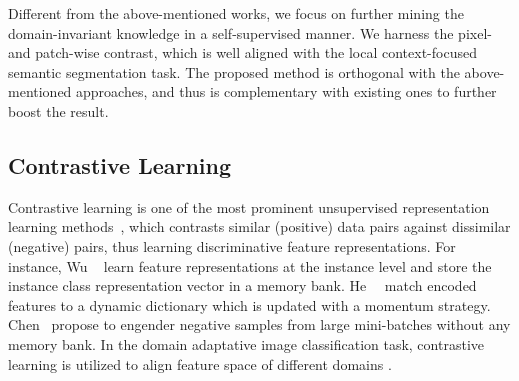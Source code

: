 \documentclass[10pt,twocolumn,letterpaper]{article}
\begin{document}
Different from the above-mentioned works, we focus on further mining the domain-invariant knowledge in a self-supervised manner. We harness the pixel- and patch-wise contrast, which is well aligned with the local context-focused semantic segmentation task. The proposed method is orthogonal with the above-mentioned approaches, and thus is complementary with existing ones to further boost the result.  





\subsection{Contrastive Learning}
Contrastive learning is one of the most prominent unsupervised representation learning methods~\cite{AaronvandenOord2018RepresentationLW, ZhirongWu2018UnsupervisedFL, XinleiChen2020ImprovedBW, TingChen2020ASF, KaimingHe2022MomentumCF}, which contrasts similar (positive) data pairs against dissimilar (negative) pairs, thus learning discriminative feature representations.
For instance, Wu \etal~\cite{ZhirongWu2018UnsupervisedFL} learn feature representations at the instance level and store the instance class representation vector in a memory bank. He~\etal~\cite{KaimingHe2022MomentumCF} match encoded features to a dynamic dictionary which is updated with a momentum strategy. Chen~\etal \cite{TingChen2020ASF} propose to engender negative samples from large mini-batches without any memory bank. In the domain adaptative image classification task, contrastive learning is utilized to align feature space of different domains \cite{GuoliangKang2019ContrastiveAN, SaeidMotiian2017UnifiedDS}. 
\end{document}
